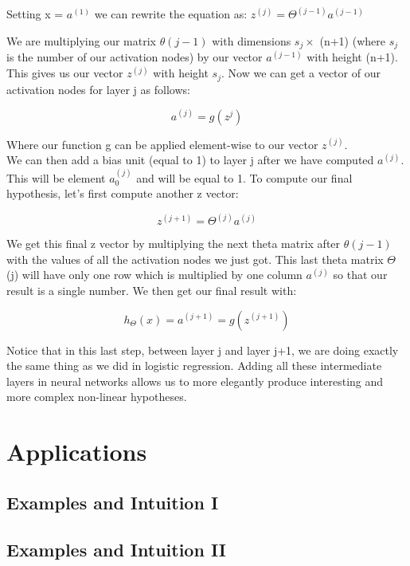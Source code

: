 Setting x = $a^{(1)}$ we can rewrite the equation as:
$z^{(j)} = \Theta^{(j-1)}a^{(j-1)}$

We are multiplying our matrix $\theta(j-1)$ with dimensions $s_j\times$ (n+1) (where $s_j$ is the number of our activation nodes) by our vector $a^{(j-1)}$ with height (n+1). This gives us our vector $z^{(j)}$ with height $s_j$. Now we can get a vector of our activation nodes for layer j as follows:

\begin{equation}
  a^{(j)} = g(z^{j})
\end{equation}

Where our function g can be applied element-wise to our vector $z^{(j)}$.\\
We can then add a bias unit (equal to 1) to layer j after we have computed $a^{(j)}$. This will be element $a_0^{(j)}$ and will be equal to 1. To compute our final hypothesis, let's first compute another z vector:

\begin{equation}
  z^{(j+1)} = \Theta^{(j)}a^{(j)}
\end{equation}

We get this final z vector by multiplying the next theta matrix after $\theta(j-1)$ with the values of all the activation nodes we just got. This last theta matrix $\Theta$(j) will have only one row which is multiplied by one column $a^{(j)}$ so that our result is a single number. We then get our final result with:

\begin{equation}
  h_\Theta(x) = a^{(j+1)} = g(z^{(j+1)})
\end{equation}

Notice that in this last step, between layer j and layer j+1, we are doing exactly the same thing as we did in logistic regression. Adding all these intermediate layers in neural networks allows us to more elegantly produce interesting and more complex non-linear hypotheses.

\section{Applications}
\subsection{Examples and Intuition I}
\subsection{Examples and Intuition II}
